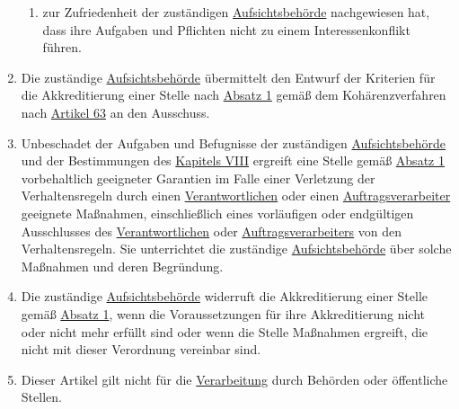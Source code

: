 \begin{enumerate}
\begin{enumerate}
    \item zur Zufriedenheit der zuständigen \hyperref[itm:04-21]{Aufsichtsbehörde} nachgewiesen hat, dass ihre Aufgaben und Pflichten nicht zu
     einem Interessenkonflikt führen.
    \label{itm:41-2d}

  \end{enumerate}

  \item Die zuständige \hyperref[itm:04-21]{Aufsichtsbehörde} übermittelt den Entwurf der Kriterien für die Akkreditierung einer Stelle nach
   \hyperref[itm:41-1]{Absatz 1} gemäß dem Kohärenzverfahren nach \hyperref[ch:63]{Artikel 63} an den Ausschuss.
  \label{itm:41-3}

  \item Unbeschadet der Aufgaben und Befugnisse der zuständigen \hyperref[itm:04-21]{Aufsichtsbehörde} und der Bestimmungen des \hyperref
   [part:8]{Kapitels VIII} ergreift eine Stelle gemäß \hyperref[itm:41-1]{Absatz 1} vorbehaltlich geeigneter Garantien
   im Falle einer Verletzung der Verhaltensregeln durch einen \hyperref[itm:04-7]{Verantwortlichen} oder einen \hyperref[itm:04-8]{Auftragsverarbeiter} geeignete
   Maßnahmen, einschließlich eines vorläufigen oder endgültigen Ausschlusses des \hyperref[itm:04-7]{Verantwortlichen} oder
   \hyperref[itm:04-8]{Auftragsverarbeiters} von den Verhaltensregeln. Sie unterrichtet die zuständige \hyperref[itm:04-21]{Aufsichtsbehörde} über solche
   Maßnahmen und deren Begründung.
  \label{itm:41-4}

  \item Die zuständige \hyperref[itm:04-21]{Aufsichtsbehörde} widerruft die Akkreditierung einer Stelle gemäß \hyperref[itm:41-1]{Absatz 1},
   wenn die Voraussetzungen für ihre Akkreditierung nicht oder nicht mehr erfüllt sind oder wenn die Stelle Maßnahmen
   ergreift, die nicht mit dieser Verordnung vereinbar sind.
  \label{itm:41-5}

  \item Dieser Artikel gilt nicht für die \hyperref[itm:04-2]{Verarbeitung} durch Behörden oder öffentliche Stellen.
  \label{itm:41-6}

\end{enumerate}


